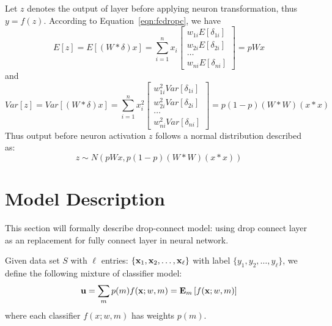 \documentclass[9pt]{article}
\begin{document}
Let $z$ denotes the output of layer before applying 
neuron transformation, thus $y=f(z)$. According to Equation~\ref{eqn:fcdropc}, we have
$$
E[z] = E[ (W*\delta)x ] = 
   \sum_{i=1}^n x_i 
   \begin{bmatrix}
      w_{1i}E[\delta_{1i}] \\ 
      w_{2i}E[\delta_{2i}] \\ 
      \ldots \\ 
      w_{ni}E[\delta_{ni}]
    \end{bmatrix} = pWx
$$
and
$$
Var[z]= Var[ (W*\delta)x ] = 
   \sum_{i=1}^n x_i^2
   \begin{bmatrix}
      w_{1i}^2Var[\delta_{1i}] \\ 
      w_{2i}^2Var[\delta_{2i}] \\ 
      \ldots \\ 
      w_{ni}^2Var[\delta_{ni}]
    \end{bmatrix} = p(1-p) (W*W)(x*x)
$$
Thus output before neuron activation $z$ follows a normal distribution described as:
\begin{equation}
   \label{eqn:dropc_normal}
   z\sim {\mathit N}\left( pWx, p(1-p)(W*W)(x*x) \right)
\end{equation}
\section{Model Description}
\label{sec:description}
This section will formally describe drop-connect model: using drop connect 
layer as an replacement for fully connect layer in neural network. 
\begin{definition}
   \label{def:mixture_model}
   Given data set $S$ with $\ell$ entries: 
   $\{{\bf x}_1,{\bf x}_2,\ldots,{\bf x}_{\ell}\}$ with label 
   $\{y_1,y_2,\ldots,y_{\ell}\}$, we define the following mixture of classifier model:
   \begin{equation}
      \label{eqn:model}
      {\bf u} = \sum_{m}p(m) f({\bf x};w,m)=\mathbf{E}_{m}\left[f({\bf x};w,m)\right]
   \end{equation}
   where each classifier $f(x;w,m)$ has weights $p(m)$.
\end{definition}
\end{document}
